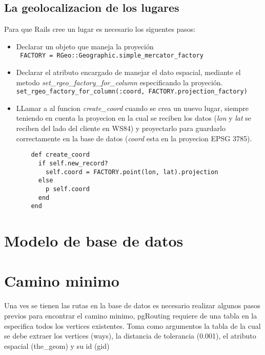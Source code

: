     \subsection{La geolocalizacion de los lugares} %
    \label{subsec:la_geolocalizacion_de_los_lugares}
      Para que Rails cree un lugar es necesario los siguentes pasos: 
        \begin{itemize}
          \item Declarar un objeto que maneja la proyeci\'on \\
          \verb+ FACTORY = RGeo::Geographic.simple_mercator_factory +
          \item Declarar el atributo encargado de manejar el dato espacial, mediante el metodo \emph{set\_rgeo\_factory\_for\_column} especificando la proyeci\'on. \verb|set_rgeo_factory_for_column(:coord, FACTORY.projection_factory)|
          \item LLamar a al funcion \emph{create\_coord} cuando se crea un nuevo lugar, siempre teniendo en cuenta la proyecion en la cual se reciben los datos (\emph{lon} y \emph{lat} se reciben del lado del cliente en WS84) y proyectarlo para guardarlo correctamente en la base de datos (\emph{coord} esta en la proyecion EPSG 3785).
          \begin{verbatim}
    def create_coord
      if self.new_record?
        self.coord = FACTORY.point(lon, lat).projection 
      else
        p self.coord
      end
    end
          \end{verbatim}
        \end{itemize}
        
    
  
  \section{Modelo de base de datos} %
  \label{sec:modelo_de_base_de_datos}
  
  \section{Camino minimo} %
  \label{sec:camino_minimo}

    Una ves se tienen las rutas en la base de datos es necesario realizar algunos pasos previos para encontrar el camino minimo, pgRouting requiere de una tabla en la especifica todos los vertices existentes. Toma como argumentos la tabla de la cual se debe extraer los vertices (ways), la distancia de tolerancia (0.001), el atributo espacial (the\_geom) y su id (gid)

